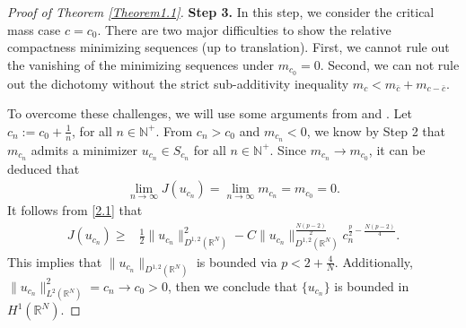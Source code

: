 \documentclass[12pt,a4paper,reqno]{amsart}
\numberwithin{equation}{section}
\begin{document}
\begin{proof}[Proof of Theorem \ref{Theorem1.1}]
{\bf Step 3.}
In this step,
we consider the critical mass case $c=c_{0}$. There are two major difficulties to show the  relative compactness minimizing sequences (up to translation).
First,
we cannot rule out the vanishing of the minimizing sequences under $m_{c_{0}}=0$.
Second,
we can not rule out the dichotomy without the strict sub-additivity inequality $m_{c}<m_{\bar{c}}+m_{c-\bar{c}}$.

To overcome these challenges, we will use some arguments from \cite[Lemma 3.2]{LuoTJ-Hajaiej2022ANS}  and \cite[Page 1936, Line 12]{Catto-Dolbeault-Sanchez-Soler2013MMMAS}.
Let $c_{n}:=c_{0}+\frac{1}{n}$, for all $n\in \mathbb{N}^{+}$.
From $c_{n}>c_{0}$ and $m_{c_{n}}<0$,
we know by Step 2 that $m_{c_{n}}$ admits a minimizer $u_{c_{n}}\in S_{c_{n}}$ for all $n\in \mathbb{N}^{+}$.
Since $m_{c_{n}}\to m_{c_{0}}$,
it can be deduced that
\begin{equation*}
\begin{aligned}
\lim_{n\to\infty}
J(u_{c_{n}})
=
\lim_{n\to\infty}
m_{c_{n}}
=
m_{c_{0}}
=0.
\end{aligned}
\end{equation*}
It follows from \eqref{2.1} that
\begin{equation*}
\begin{aligned}
J(u_{c_{n}})
\geqslant&
\frac{1}{2}
\|u_{c_{n}}\|_{D^{1,2}(\mathbb{R}^{N})}^{2}
-
C
\|u_{c_{n}}\|_{D^{1,2}(\mathbb{R}^{N})}^{\frac{N(p-2)}{2}}
c_{n}^{\frac{p}{2}-\frac{N(p-2)}{4}}.
\end{aligned}
\end{equation*}
This implies that $\|u_{c_{n}}\|_{D^{1,2}(\mathbb{R}^{N})}$ is bounded via $p<2+\frac{4}{N}$.
Additionally,
$\|u_{c_{n}}\|_{L^{2}(\mathbb{R}^{N})}^{2}=c_{n}\to c_{0}>0$,
then we conclude that $\{u_{c_{n}}\}$ is bounded in $H^{1}(\mathbb{R}^{N})$.


\end{proof}
\end{document}
